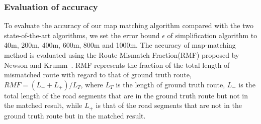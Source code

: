 




\subsubsection {Evaluation of accuracy}
To evaluate the accuracy of our map
matching algorithm compared with the two state-of-the-art algorithms, we set the error bound $\epsilon$
of simplification algorithm to 40m, 200m, 400m, 600m, 800m and 1000m.
The accuracy of map-matching method is evaluated using the
Route Mismatch Fraction(RMF) proposed by Newson and Krumm~\cite{Newson2009Hidden}.
RMF represents the fraction of the total length of mismatched
route with regard to that of ground truth route, {$RMF = (L_- + L_+) / L_T$}, where $L_T$ is the length of ground truth
route, $L_-$ is the total length of the road segments that are in the ground truth route but not in the matched result, while $L_+$ is that of the
road segments that are not in the ground truth route but in the matched result.



